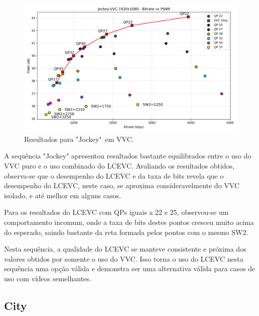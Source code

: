 \begin{figure}[h]
    \centering
    \includegraphics[width=1.0\textwidth]{img/Jockey-VVC.png}
    \caption{Resultados para "Jockey"\ em \acrshort{VVC}. \cite{uvg_dataset}}
    \label{fig:Jockey-VVC}
\end{figure}

A sequência "Jockey" apresentou resultados bastante equilibrados entre o uso do 
\acrshort{VVC} puro e o uso combinado do \acrshort{LCEVC}. Avaliando os  resultados
obtidos, observa-se que o desempenho do \acrshort{LCEVC} e da taxa de bits revela
que o desempenho do \acrshort{LCEVC}, neste caso, se aproxima consideravelmente do
\acrshort{VVC} isolado, e até melhor em alguns casos.

Para os resultados do \acrshort{LCEVC} com QPs iguais a 22 e 25, observou-se um 
comportamento incomum, onde a taxa de bits destes pontos cresceu muito 
acima do esperado, saindo bastante da reta formada pelos pontos com o mesmo SW2.

Nesta sequência, a qualidade do \acrshort{LCEVC} se manteve consistente e próxima
dos valores obtidos por somente o uso do \acrshort{VVC}. Isso torna o uso do 
\acrshort{LCEVC} nesta sequência uma opção válida e demonstra ser uma alternativa
válida para casos de uso com vídeos semelhantes.

\newpage
\subsection{City}

